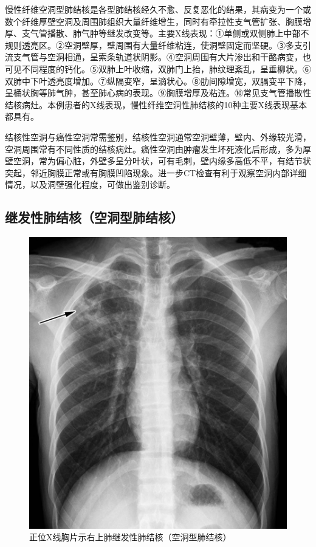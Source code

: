 慢性纤维空洞型肺结核是各型肺结核经久不愈、反复恶化的结果，其病变为一个或数个纤维厚壁空洞及周围肺组织大量纤维增生，同时有牵拉性支气管扩张、胸膜增厚、支气管播散、肺气肿等继发改变等。主要X线表现：①单侧或双侧肺上中部不规则透亮区。②空洞壁厚，壁周围有大量纤维粘连，使洞壁固定而坚硬。③多支引流支气管与空洞相通，呈索条轨道状阴影。④空洞周围有大片渗出和干酪病变，也可见不同程度的钙化。⑤双肺上叶收缩，双肺门上抬，肺纹理紊乱，呈垂柳状。⑥双肺中下叶透亮度增加。⑦纵隔变窄，呈滴状心。⑧肋间隙增宽，双膈变平下降，呈桶状胸等肺气肿，甚至肺心病的表现。⑨胸膜增厚及粘连。⑩常见支气管播散性结核病灶。本例患者的X线表现，慢性纤维空洞性肺结核的10种主要X线表现基本都具有。

结核性空洞与癌性空洞常需鉴别，结核性空洞通常空洞壁薄，壁内、外缘较光滑，空洞周围常有不同性质的结核病灶。癌性空洞由肿瘤发生坏死液化后形成，多为厚壁空洞，常为偏心脏，外壁多呈分叶状，可有毛刺，壁内缘多高低不平，有结节状突起，邻近胸膜正常或有胸膜凹陷现象。进一步CT检查有利于观察空洞内部详细情况，以及洞壁强化程度，可做出鉴别诊断。

\subsection{继发性肺结核（空洞型肺结核）}

\begin{figure}[!htbp]
 \centering
 \includegraphics{./images/Image00157.jpg}
 \captionsetup{justification=centering}
 \caption{正位X线胸片示右上肺继发性肺结核（空洞型肺结核）}
 \label{fig3-5-5}
  \end{figure} 

